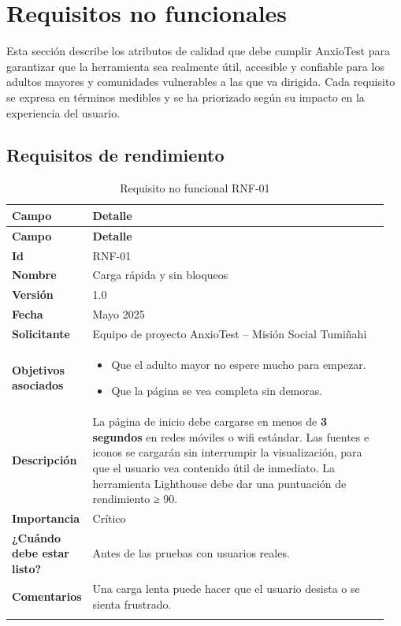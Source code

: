 \newpage
\section{Requisitos no funcionales}
\label{sec:req_no_funcionales}

Esta sección describe los atributos de calidad que debe cumplir AnxioTest para garantizar que la herramienta sea realmente útil, accesible y confiable para los adultos mayores y comunidades vulnerables a las que va dirigida. Cada requisito se expresa en términos medibles y se ha priorizado según su impacto en la experiencia del usuario.

\subsection{Requisitos de rendimiento}
\label{sec:rnf_rendimiento}

\begin{longtable}{p{0.15\linewidth} p{0.80\linewidth}}
\toprule
\rowcolor{tableheader!20}
\textbf{Campo} & \textbf{Detalle} \\
\midrule
\endfirsthead
\rowcolor{tableheader!20}
\textbf{Campo} & \textbf{Detalle} \\
\midrule
\endhead
\bottomrule
\endfoot
\textbf{Id} & RNF-01 \\
\textbf{Nombre} & Carga rápida y sin bloqueos \\
\textbf{Versión} & 1.0 \\
\textbf{Fecha} & Mayo 2025 \\
\textbf{Solicitante} & Equipo de proyecto AnxioTest – Misión Social Tumiñahi \\
\textbf{Objetivos asociados} & 
  \begin{itemize}
    \item Que el adulto mayor no espere mucho para empezar.
    \item Que la página se vea completa sin demoras.
  \end{itemize} \\
\textbf{Descripción} & La página de inicio debe cargarse en menos de \textbf{3 segundos} en redes móviles o wifi estándar. Las fuentes e iconos se cargarán sin interrumpir la visualización, para que el usuario vea contenido útil de inmediato. La herramienta Lighthouse debe dar una puntuación de rendimiento ≥ 90. \\
\textbf{Importancia} & Crítico \\
\textbf{¿Cuándo debe estar listo?} & Antes de las pruebas con usuarios reales. \\
\textbf{Comentarios} & Una carga lenta puede hacer que el usuario desista o se sienta frustrado. \\
\bottomrule
\caption{Requisito no funcional RNF-01}
\end{longtable}

